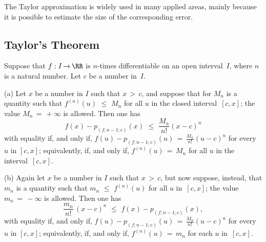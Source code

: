 \VV

        The Taylor approximation is widely used in many applied areas, mainly because it is possible to estimate the size of the corresponding error.

\V

            \subsection{\small{\bf Taylor's Theorem}}
            \label{ThmE40.69A}

\V

        Suppose that $f:I \,{\rightarrow}\, {\RR}$ is $n$-times differentiable on an open interval~$I$, where $n$ is a natural number.
    Let $c$ be a number in~$I$.

\V

        (a) Let $x$ be a number in $I$ such that $x\,>\,c$, and suppose that for $M_{n}$ is a quantity such that $f^{(n)}(u)\,\,{\leq}\,\,M_{n}$
    for all $u$ in the closed interval~$[c,x]$; the value $M_{n} \,=\, +{\infty}$ is allowed. Then one has
        \begin{displaymath}
        f(x)- p_{(f;n-1;c)}(x)\,\,{\leq}\,\, \frac{M_{n}}{n!}(x-c)^{n}
        \end{displaymath}
     with equality if, and only if, ${\displaystyle f(u)- p_{(f;n-1;c)}(u) \,=\,  \frac{M_{n}}{n!}(u-c)^{n}}$ for every $u$ in $[c,x]$;
    equivalently, if, and only if, $f^{(n)}(u) \,=\, M_{n}$ for all $u$ in the interval~$[c,x]$.

\V

        (b) Again let $x$ be a number in $I$ such that $x\,>\,c$, but now suppose, instead,
    that $m_{n}$ is a quantity such that $m_{n}\,\,{\leq}\,\,f^{(n)}(u)$ for all $u$ in~$[c,x]$; the value $m_{n} \,=\, -{\infty}$ is allowed. Then one has
        \begin{displaymath}
        \frac{m_{n}}{n!}\,(x-c)^{n}\,\,{\leq}\,\,f(x)- p_{(f;n-1;c)}(x),
        \end{displaymath}
    with equality if, and only if, ${\displaystyle f(u)- p_{(f;n-1;c)}(u) \,=\,  \frac{M_{n}}{n!}(u-c)^{n}}$ for every $u$ in $[c,x]$;
    equivalently, if, and only if, $f^{(n)}(u) \,=\, m_{n}$ for each $u$ in~$[c,x]$.

\V

